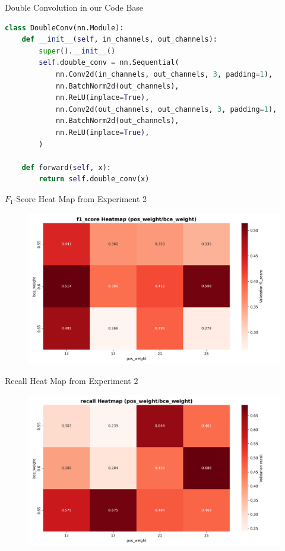 \documentclass{beamer}
\begin{document}
\begin{frame}[fragile]{Double Convolution in our Code Base}
    \begin{lstlisting}[language=Python]
class DoubleConv(nn.Module):
    def __init__(self, in_channels, out_channels):
        super().__init__()
        self.double_conv = nn.Sequential(
            nn.Conv2d(in_channels, out_channels, 3, padding=1),
            nn.BatchNorm2d(out_channels),
            nn.ReLU(inplace=True),
            nn.Conv2d(out_channels, out_channels, 3, padding=1),
            nn.BatchNorm2d(out_channels),
            nn.ReLU(inplace=True),
        )

    def forward(self, x):
        return self.double_conv(x)
    \end{lstlisting}
\end{frame}

\begin{frame}{$F_1$-Score Heat Map from Experiment 2}
    \begin{figure}
        \centering
        \includegraphics[height=0.7\textheight]{Images/12_heatmap_f1_score_by_weights.png}
    \end{figure}
\end{frame}

\begin{frame}{Recall Heat Map from Experiment 2}
    \begin{figure}
        \centering
        \includegraphics[height=0.7\textheight]{Images/12_heatmap_recall_by_weights.png}
    \end{figure}
\end{frame}
\end{document}
